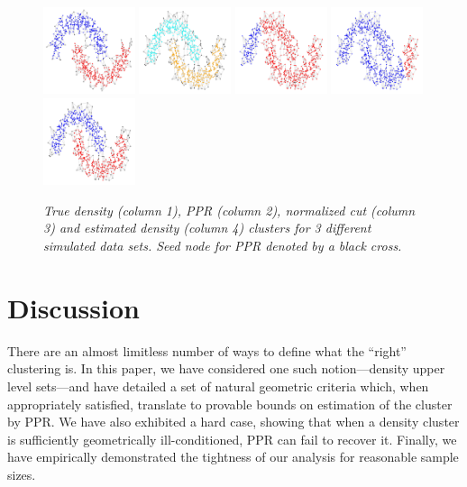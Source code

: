 \documentclass[11pt,twoside]{article}
\theoremstyle{definition}
\newcommand{\1}{\mathbbm{1}}
\begin{document}
\begin{figure}
  \includegraphics[width=0.24\textwidth]{row2_density_cluster}
  \includegraphics[width=0.24\textwidth]{row3_true_density_cluster}
  \includegraphics[width=0.24\textwidth]{row3_ppr_cluster}
  \includegraphics[width=0.24\textwidth]{row3_conductance_cluster}
  \includegraphics[width=0.24\textwidth]{row3_density_cluster}
  \caption{\it\small True density (column 1), PPR (column 2), normalized
    cut (column 3) and estimated density (column 4) clusters for 3 different 
    simulated data sets. Seed node for PPR denoted by a black cross.} 
  \label{fig:moons}
\end{figure}

\section{Discussion}
\label{sec: discussion}

There are an almost limitless number of ways to define what the ``right''
clustering is. In this paper, we have considered one such notion---density upper
level sets---and have detailed a set of natural geometric criteria which, when 
appropriately satisfied, translate to provable bounds on estimation of the
cluster by PPR. We have also exhibited a hard case, showing that when a density
cluster is sufficiently geometrically ill-conditioned, PPR can fail to recover
it. Finally, we have empirically demonstrated the tightness of our analysis for
reasonable sample sizes.  
\end{document}
